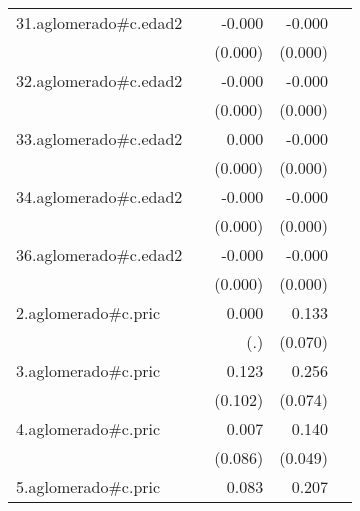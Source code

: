 {\begin{longtable}{l*{4}{D{.}{.}{-1}}}
\addlinespace
31.aglomerado#c.edad2&                     &      -0.000         &      -0.000\sym{*}  &                     \\
            &                     &     (0.000)         &     (0.000)         &                     \\
\addlinespace
32.aglomerado#c.edad2&                     &      -0.000\sym{**} &      -0.000\sym{***}&                     \\
            &                     &     (0.000)         &     (0.000)         &                     \\
\addlinespace
33.aglomerado#c.edad2&                     &       0.000         &      -0.000\sym{***}&                     \\
            &                     &     (0.000)         &     (0.000)         &                     \\
\addlinespace
34.aglomerado#c.edad2&                     &      -0.000         &      -0.000\sym{*}  &                     \\
            &                     &     (0.000)         &     (0.000)         &                     \\
\addlinespace
36.aglomerado#c.edad2&                     &      -0.000         &      -0.000         &                     \\
            &                     &     (0.000)         &     (0.000)         &                     \\
\addlinespace
2.aglomerado#c.pric&                     &       0.000         &       0.133         &                     \\
            &                     &         (.)         &     (0.070)         &                     \\
\addlinespace
3.aglomerado#c.pric&                     &       0.123         &       0.256\sym{***}&                     \\
            &                     &     (0.102)         &     (0.074)         &                     \\
\addlinespace
4.aglomerado#c.pric&                     &       0.007         &       0.140\sym{**} &                     \\
            &                     &     (0.086)         &     (0.049)         &                     \\
\addlinespace
5.aglomerado#c.pric&                     &       0.083         &       0.207\sym{**} &                     \\

\end{longtable}}
